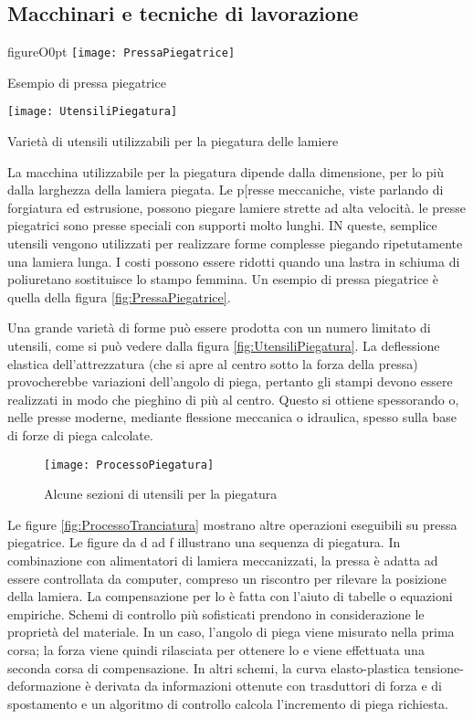 \subsection{Macchinari e tecniche di lavorazione}
\begin{wrapfloat}{figure}{O}{0pt}
\texttt{[image: PressaPiegatrice]}
\caption{Esempio di pressa piegatrice}
\label{fig:PressaPiegatrice}
\texttt{[image: UtensiliPiegatura]}
\caption{Varietà di utensili utilizzabili per la piegatura delle lamiere}
\label{fig:UtensiliPiegatura}
\end{wrapfloat}

La macchina utilizzabile per la piegatura dipende dalla dimensione, per lo più dalla larghezza della lamiera piegata.
Le p[resse meccaniche, viste parlando di forgiatura ed estrusione, possono piegare lamiere strette ad alta velocità.
le presse piegatrici sono presse speciali con supporti molto lunghi. IN queste, semplice utensili vengono utilizzati per realizzare forme complesse piegando ripetutamente una lamiera lunga.
I costi possono essere ridotti quando una lastra in schiuma di poliuretano sostituisce lo stampo femmina.
Un esempio di pressa piegatrice è quella della figura \ref{fig:PressaPiegatrice}.

Una grande varietà di forme può essere prodotta con un numero limitato di utensili, come si può vedere dalla figura \ref{fig:UtensiliPiegatura}. 
La deflessione elastica dell'attrezzatura (che si apre al centro sotto la forza della pressa) provocherebbe variazioni dell'angolo di piega, pertanto gli stampi devono essere realizzati in modo che pieghino di più al centro.
Questo si ottiene spessorando o, nelle presse moderne, mediante flessione meccanica o idraulica, spesso sulla base di forze di piega calcolate.

\begin{figure}
\centering
\texttt{[image: ProcessoPiegatura]}
\caption{Alcune sezioni di utensili per la piegatura}
\label{fig:PreocessoPiegatura}
\end{figure}

Le figure \ref{fig:ProcessoTranciatura} mostrano altre operazioni eseguibili su pressa piegatrice. Le figure da d ad f illustrano una sequenza di piegatura.
In combinazione con alimentatori di lamiera meccanizzati, la pressa è adatta ad essere controllata da computer, compreso un riscontro per rilevare la posizione della lamiera. La compensazione per lo  è fatta con l'aiuto di tabelle o equazioni empiriche.
Schemi di controllo più sofisticati prendono in considerazione le proprietà del materiale. In un caso, l'angolo di piega viene misurato nella prima corsa; la forza viene quindi rilasciata per ottenere lo  e viene effettuata una seconda corsa di compensazione.
In altri schemi, la curva elasto-plastica tensione-deformazione è derivata da informazioni ottenute con trasduttori di forza e di spostamento e un algoritmo di controllo calcola l'incremento di piega richiesta.

